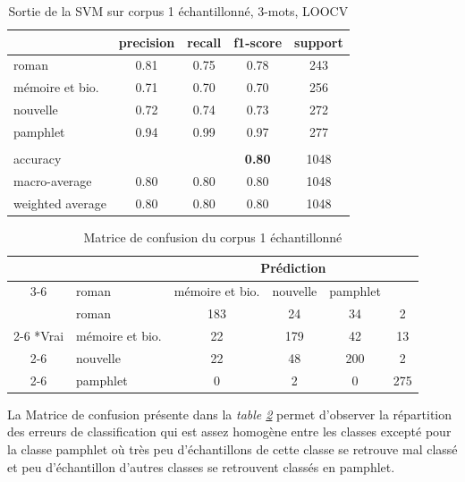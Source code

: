 \begin{table}[H]
    \centering 
    \begin{tabular}{l c c c c}
        \toprule
             & precision & recall & f1-score & support \\
        \toprule
        \midrule
        roman & 0.81 & 0.75 & 0.78 & 243 \\
        \midrule
        mémoire et bio. & 0.71 & 0.70 & 0.70 & 256\\
        \midrule
        nouvelle & 0.72 & 0.74 & 0.73 & 272\\
        \midrule
        pamphlet & 0.94 & 0.99 & 0.97 & 277\\
        \midrule
        & & & & \\
        \midrule
        accuracy & & & \textbf{0.80} & 1048 \\
        \midrule
        macro-average & 0.80 & 0.80 & 0.80 & 1048\\
        \midrule
        weighted average & 0.80 & 0.80 & 0.80 & 1048\\

        \bottomrule
    \end{tabular}
\caption{Sortie de la SVM sur corpus 1 échantillonné, 3-mots, LOOCV}
\label{'tab:SVMcorpus1'}
\end{table} 

\begin{table}[H]
    \centering 
    \begin{tabular}{|c|l|c|c|c|c|}
        \hline
        \multicolumn{2}{|c|}{} & \multicolumn{4}{c|}{Prédiction} \\
        \cline{3-6}
        \multicolumn{2}{|c|}{} & roman & mémoire et bio. & nouvelle & pamphlet \\
        \hline
        & roman & 183 & 24 & 34 & 2 \\
        \cline{2-6}
        \multirow{3}*{Vrai} & mémoire et bio. & 22 & 179 & 42 & 13 \\
        \cline{2-6}
        & nouvelle & 22 & 48 & 200 & 2 \\
        \cline{2-6}
        & pamphlet & 0 & 2 & 0 & 275 \\
        \hline
    \end{tabular}
\caption{Matrice de confusion du corpus 1 échantillonné}
\label{'tab:matriceconfusioncorpus1'}
\end{table}
La Matrice de confusion présente dans la \textit{table \ref{'tab:matriceconfusioncorpus1'}} permet d'observer la répartition des erreurs de classification qui est assez homogène entre les classes excepté pour la classe pamphlet où très peu d'échantillons de cette classe se retrouve mal classé et peu d'échantillon d'autres classes se retrouvent classés en pamphlet.


